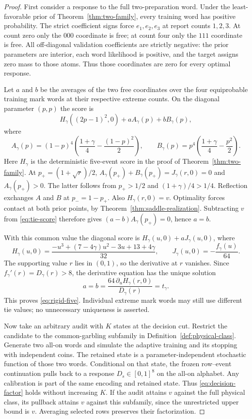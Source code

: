 \begin{proof}
First consider a response to the full two-preparation word. Under the
least-favorable prior of Theorem~\ref{thm:two-family}, every training
word has positive probability. The strict coefficient signs force
$e_1,e_2,e_3$ at report counts $1,2,3$. At count zero only the $000$
coordinate is free; at count four only the $111$ coordinate is free.
All off-diagonal validation coefficients are strictly negative: the
prior parameters are interior, each word likelihood is positive, and
the target assigns zero mass to those atoms. Thus those coordinates
are zero for every optimal response.

Let $a$ and $b$ be the averages of the two free coordinates over the
four equiprobable training mark words at their respective extreme
counts. On the diagonal parameter $(p,p)$ the score is
\begin{equation}\label{eq:tie-score}
 H_\gamma((2p-1)^2,0)+aA_\gamma(p)+bB_\gamma(p),
\end{equation}
where
\[
 A_\gamma(p)=(1-p)^4\left(\frac{1+\gamma}{4}
                                  -\frac{(1-p)^2}{2}\right),\qquad
 B_\gamma(p)=p^4\left(\frac{1+\gamma}{4}-\frac{p^2}{2}\right).
\]
Here $H_\gamma$ is the deterministic five-event score in the proof of
Theorem~\ref{thm:two-family}. At $p_+=(1+\sqrt r)/2$,
$A_\gamma(p_+)+B_\gamma(p_+)=J_\gamma(r,0)=0$ and
$A_\gamma(p_+)>0$. The latter follows from $p_+>1/2$ and
$(1+\gamma)/4>1/4$. Reflection exchanges $A$ and $B$ at
$p_-=1-p_+$. Also $H_\gamma(r,0)=v$. Optimality forces contact at
both prior points, by Theorem~\ref{thm:saddle-realization}. Subtracting
$v$ from \eqref{eq:tie-score} therefore gives
$(a-b)A_\gamma(p_+)=0$, hence $a=b$.

With this common value the diagonal score is $H_\gamma(u,0)+aJ_\gamma(u,0)$,
where
\[
 H_\gamma(u,0)=\frac{-u^3+(7-4\gamma)u^2-3u+13+4\gamma}{32},
 \qquad J_\gamma(u,0)=-\frac{f_\gamma(u)}{64}.
\]
The supporting value $r$ lies in $(0,1)$, so the derivative at $r$
vanishes. Since $f_\gamma'(r)=D_\gamma(r)>8$, the derivative equation
has the unique solution
\[
 a=b=\frac{64\,\partial_uH_\gamma(r,0)}{D_\gamma(r)}=t_\gamma.
\]
This proves \eqref{eq:rigid-five}. Individual extreme mark words may
still use different tie values; no unnecessary uniqueness is asserted.

Now take an arbitrary audit with $K$ states at the decision cut.
Restrict the candidate to the common-garbling subfamily in
Definition~\ref{def:physical-class}. Generate two all-on words and
simulate the adaptive training and its stopping with independent coins.
The retained state is a parameter-independent stochastic function of
those two words. Conditional on that state, the frozen row--event
continuation pulls back to a response $D_s\in[0,1]^8$ on the all-on
alphabet. Any calibration is part of the same encoding and retained
state. Thus \eqref{eq:decision-factor} holds without increasing $K$.
If the audit attains $v$ against the full physical class, its pullback
attains $v$ against this subfamily, since the unrestricted upper bound
is $v$. Averaging selected rows preserves their factorization.


\end{proof}
